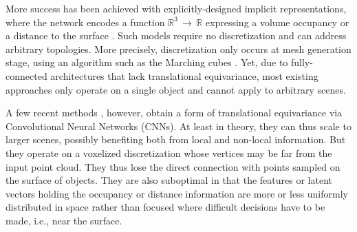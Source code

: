 \documentclass[10pt,twocolumn,letterpaper]{article}
\begin{document}
More success has been achieved with explicitly-designed implicit representations, where the network encodes a function $\mathbb{R}^3 \,{\rightarrow}\, \mathbb{R}$ expressing a volume occupancy \cite{Chen2019CVPR,Mescheder2019CVPR} or a distance to the  surface \cite{Michalkiewicz2019ICCV,Park2019CVPR}. 
Such models require no discretization and can address arbitrary topologies. More precisely, discretization only occurs at mesh generation stage, using an algorithm such as the Marching cubes \cite{Lorensen1987CG}. Yet, due to fully-connected architectures that lack translational equivariance, most existing approaches only operate on a single object and cannot apply to arbitrary scenes. 


A few recent methods \cite{Jiang2020CVPR, Chibane2020CVPR, dai2020sgnn, Peng2020ECCV, Chibane2020Neural, Ummenhofer2021Adaptive}, however, obtain a form of translational equivariance via Convolutional Neural Networks (CNNs). At least in theory, they can thus scale to larger scenes, possibly benefiting both from local and non-local information. But they operate on a voxelized discretization whose vertices may be far from the input point cloud. They thus lose the direct connection with points sampled on the surface of objects. They are also suboptimal in that the features or latent vectors holding the occupancy or distance information are more or less uniformly distributed in space rather than focused where difficult decisions have to be made, i.e., near the surface. 
\end{document}
